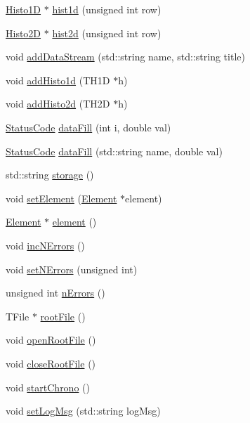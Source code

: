 \begin{DoxyCompactItemize}
\hyperlink{classHisto1D}{Histo1D} $\ast$ \hyperlink{classProcessus_a409227db936baff03c0462c1bcfe8069}{hist1d} (unsigned int row)
\item 
\hyperlink{classHisto2D}{Histo2D} $\ast$ \hyperlink{classProcessus_a73b5118cb5f2b5eaad33286183b86cfc}{hist2d} (unsigned int row)
\item 
void \hyperlink{classProcessus_a308c8f193802f1d1ab49d4447d0cb281}{addDataStream} (std::string name, std::string title)
\item 
void \hyperlink{classProcessus_ad46e0d4dfdfdcbce001ee6be1746dfa4}{addHisto1d} (TH1D $\ast$h)
\item 
void \hyperlink{classProcessus_ac1ed1aed5edaeabdf18aa56775440471}{addHisto2d} (TH2D $\ast$h)
\item 
\hyperlink{classStatusCode}{StatusCode} \hyperlink{classProcessus_a0d093b48f3218a088ba030e24372f18c}{dataFill} (int i, double val)
\item 
\hyperlink{classStatusCode}{StatusCode} \hyperlink{classProcessus_aa31ab71711f7af6a729441ff573f69c9}{dataFill} (std::string name, double val)
\item 
std::string \hyperlink{classProcessus_a33fa1a0b54a636e5cdd680669fd9ea51}{storage} ()
\item 
void \hyperlink{classProcessus_a8ddef94227d83d9dae2cd49aebc33353}{setElement} (\hyperlink{classElement}{Element} $\ast$element)
\item 
\hyperlink{classElement}{Element} $\ast$ \hyperlink{classProcessus_a6fe155527431a7190b7d44d600b9608d}{element} ()
\item 
void \hyperlink{classProcessus_abe603d0636f76db6aa6c5c60cf34c591}{incNErrors} ()
\item 
void \hyperlink{classProcessus_a831b027b9cf18ab56fa6147b5d3055da}{setNErrors} (unsigned int)
\item 
unsigned int \hyperlink{classProcessus_a82a0487f82f07cc2c2dc2731f98149e7}{nErrors} ()
\item 
TFile $\ast$ \hyperlink{classProcessus_a247e8c362ec08422cf53d08dd23b093c}{rootFile} ()
\item 
void \hyperlink{classProcessus_aacf6812880c1d1a2bf14a4a39458f443}{openRootFile} ()
\item 
void \hyperlink{classProcessus_a2f3c41e99da4c738ea3d8f7b0d20a665}{closeRootFile} ()
\item 
void \hyperlink{classProcessus_a5e4d34b86241fa0756e07375a14ff4b2}{startChrono} ()
\item 
void \hyperlink{classProcessus_a471833f89047aa9a7ff6200a31c17a1d}{setLogMsg} (std::string logMsg)

\end{DoxyCompactItemize}
